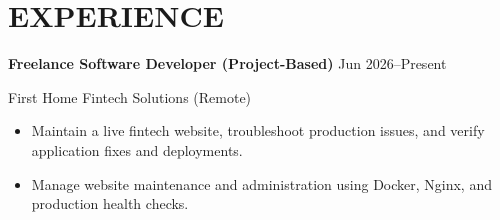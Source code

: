 \section*{EXPERIENCE}

\textbf{Freelance Software Developer (Project-Based)}
\hfill Jun 2026--Present

First Home Fintech Solutions (Remote)

\begin{itemize}
\item Maintain a live fintech website, troubleshoot production issues, and verify application fixes and deployments.
\item Manage website maintenance and administration using Docker, Nginx, and production health checks.
\end{itemize}
